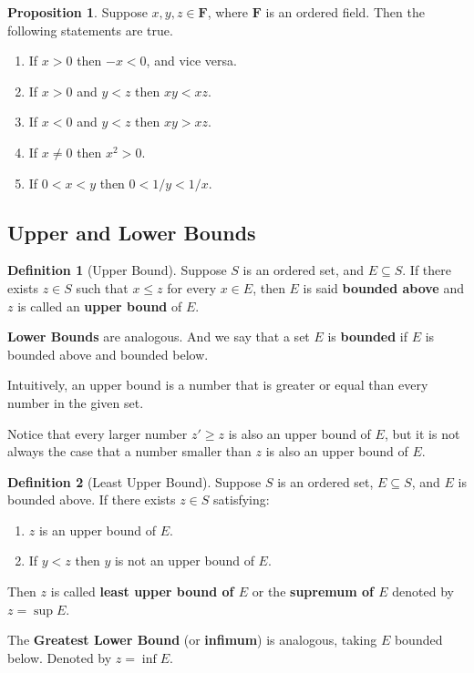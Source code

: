 \documentclass[tikz,12pt,a4paper]{article}
\theoremstyle{definition}
\newtheorem{proposition}[theorem]{Proposition}
\newtheorem{definition}{Definition}[section]
\begin{document}
\begin{proposition}
  Suppose $x, y, z \in \textbf{F}$, where $\textbf{F}$ is an ordered field. Then the following statements are true.
  \begin{enumerate}
    \item If $x > 0$ then $-x < 0$, and vice versa.
    \item If $x > 0$ and $y < z$ then $xy < xz$.
    \item If $x < 0$ and $y < z$ then $xy > xz$.
    \item If $x \neq 0$ then $x^2 > 0$.
    \item If $0 < x < y$ then $0 < 1/y < 1/x$.
  \end{enumerate}
\end{proposition}


\subsection{Upper and Lower Bounds}

\begin{definition}[Upper Bound]
  Suppose \(S\) is an ordered set, and \(E \subseteq S\). If there exists
  \(z \in S\) such that \(x \leq z\) for every \(x \in E\), then \(E\) is
  said \textbf{bounded above} and \(z\) is called an \textbf{upper bound}
  of \(E\).
  
  \textbf{Lower Bounds} are analogous. And we say that a set $E$ is \textbf{bounded} if $E$ is bounded above and bounded below. 
\end{definition}

Intuitively, an upper bound is a number that is greater or equal than every number in the given set.

Notice that every larger number $z' \geq z$ is also an upper bound of $E$, but it is not always the case that a number smaller than $z$ is also an upper bound of $E$.

\begin{definition}[Least Upper Bound]
  Suppose \(S\) is an ordered set, \(E \subseteq S\), and \(E\) is bounded
  above. If there exists \(z \in S\) satisfying:
  \begin{enumerate}
    \item \(z\) is an upper bound of \(E\).
    \item If \(y < z\) then \(y\) is not an upper bound of \(E\).
  \end{enumerate}
  Then \(z\) is called \textbf{least upper bound of \(E\)} or the \textbf{supremum of \(E\)} denoted by \(z = \sup E\).
  
  The \textbf{Greatest Lower Bound} (or \textbf{infimum}) is analogous, taking \(E\) bounded below. Denoted by \(z = \inf E\).
\end{definition}
\end{document}
